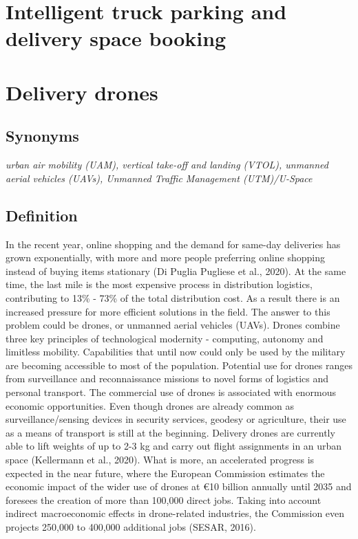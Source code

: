 \documentclass[
]{book}
\begin{document}
\hypertarget{intelligent-truck-parking-and-delivery-space-booking}{%
\section{Intelligent truck parking and delivery space booking}\label{intelligent-truck-parking-and-delivery-space-booking}}

\hypertarget{delivery-drones}{%
\section{Delivery drones}\label{delivery-drones}}

\hypertarget{synonyms-14}{%
\subsection*{Synonyms}\label{synonyms-14}}

\emph{urban air mobility (UAM), vertical take-off and landing (VTOL), unmanned aerial vehicles (UAVs), Unmanned Traffic Management (UTM)/U-Space}

\hypertarget{definition-16}{%
\subsection*{Definition}\label{definition-16}}

In the recent year, online shopping and the demand for same-day deliveries has grown exponentially, with more and more people preferring online shopping instead of buying items stationary (Di Puglia Pugliese et al., 2020). At the same time, the last mile is the most expensive process in distribution logistics, contributing to 13\% - 73\% of the total distribution cost. As a result there is an increased pressure for more efficient solutions in the field. The answer to this problem could be drones, or unmanned aerial vehicles (UAVs). Drones combine three key principles of technological modernity - computing, autonomy and limitless mobility. Capabilities that until now could only be used by the military are becoming accessible to most of the population. Potential use for drones ranges from surveillance and reconnaissance missions to novel forms of logistics and personal transport. The commercial use of drones is associated with enormous economic opportunities. Even though drones are already common as surveillance/sensing devices in security services, geodesy or agriculture, their use as a means of transport is still at the beginning. Delivery drones are currently able to lift weights of up to 2-3 kg and carry out flight assignments in an urban space (Kellermann et al., 2020).
What is more, an accelerated progress is expected in the near future, where the European Commission estimates the economic impact of the wider use of drones at €10 billion annually until 2035 and foresees the creation of more than 100,000 direct jobs. Taking into account indirect macroeconomic effects in drone-related industries, the Commission even projects 250,000 to 400,000 additional jobs (SESAR, 2016).
\end{document}
